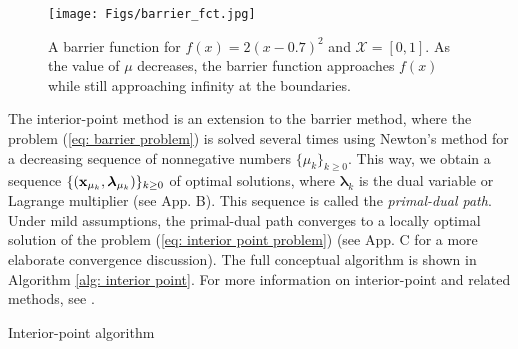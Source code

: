 \begin{figure}
    \centering
    \texttt{[image: Figs/barrier\_fct.jpg]}
    \caption{A barrier function for $f(x) = 2(x - 0.7)^2$ and $\mathcal{X} = [0, 1]$. As the value of $\mu$ decreases, the barrier function approaches $f(x)$ while still approaching infinity at the boundaries.}
    \label{fig:barrier fct}
\end{figure}

The interior-point method is an extension to the barrier method, where the problem (\ref{eq: barrier problem}) is solved several times using Newton's method for a decreasing sequence of nonnegative numbers $\{\mu_k\}_{k \geq 0}$. This way, we obtain a sequence $\{(\mathbf{x}_{\mu_k}, \bm{\lambda}_{\mu_k})\}_{k \geq 0}$ of optimal solutions, where $\bm{\lambda}_k$ is the dual variable or Lagrange multiplier (see App. B). This sequence is called the \emph{primal-dual path}. Under mild assumptions, the primal-dual path converges to a locally optimal solution of the problem (\ref{eq: interior point problem}) (see App. C for a more elaborate convergence discussion). The full conceptual algorithm is shown in Algorithm \ref{alg: interior point}. For more information on interior-point and related methods, see \cite[Ch. 11]{boyd_convex_2004}.

\begin{algorithm}[t]
\caption{Interior-point algorithm}\label{alg: interior point}
\begin{algorithmic}
\ENDIF
\ENDFOR
\end{algorithmic}
\end{algorithm}



